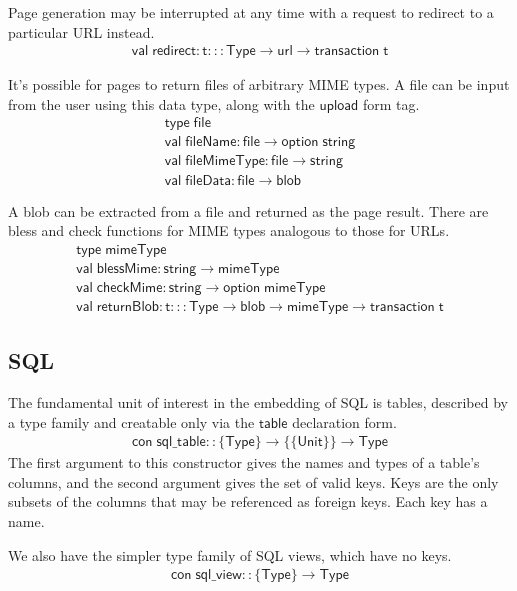 \documentclass{article}
\newcommand{\mt}[1]{\mathsf{#1}}
\begin{document}
Page generation may be interrupted at any time with a request to redirect to a particular URL instead.
$$\begin{array}{l}
  \mt{val} \; \mt{redirect} : \mt{t} ::: \mt{Type} \to \mt{url} \to \mt{transaction} \; \mt{t}
\end{array}$$

It's possible for pages to return files of arbitrary MIME types.  A file can be input from the user using this data type, along with the $\mt{upload}$ form tag.
$$\begin{array}{l}
  \mt{type} \; \mt{file} \\
  \mt{val} \; \mt{fileName} : \mt{file} \to \mt{option} \; \mt{string} \\
  \mt{val} \; \mt{fileMimeType} : \mt{file} \to \mt{string} \\
  \mt{val} \; \mt{fileData} : \mt{file} \to \mt{blob}
\end{array}$$

A blob can be extracted from a file and returned as the page result.  There are bless and check functions for MIME types analogous to those for URLs.
$$\begin{array}{l}
  \mt{type} \; \mt{mimeType} \\
  \mt{val} \; \mt{blessMime} : \mt{string} \to \mt{mimeType} \\
  \mt{val} \; \mt{checkMime} : \mt{string} \to \mt{option} \; \mt{mimeType} \\
  \mt{val} \; \mt{returnBlob} : \mt{t} ::: \mt{Type} \to \mt{blob} \to \mt{mimeType} \to \mt{transaction} \; \mt{t}
\end{array}$$

\subsection{SQL}

The fundamental unit of interest in the embedding of SQL is tables, described by a type family and creatable only via the $\mt{table}$ declaration form.
$$\begin{array}{l}
  \mt{con} \; \mt{sql\_table} :: \{\mt{Type}\} \to \{\{\mt{Unit}\}\} \to \mt{Type}
\end{array}$$
The first argument to this constructor gives the names and types of a table's columns, and the second argument gives the set of valid keys.  Keys are the only subsets of the columns that may be referenced as foreign keys.  Each key has a name.

We also have the simpler type family of SQL views, which have no keys.
$$\begin{array}{l}
  \mt{con} \; \mt{sql\_view} :: \{\mt{Type}\} \to \mt{Type}
\end{array}$$
\end{document}
